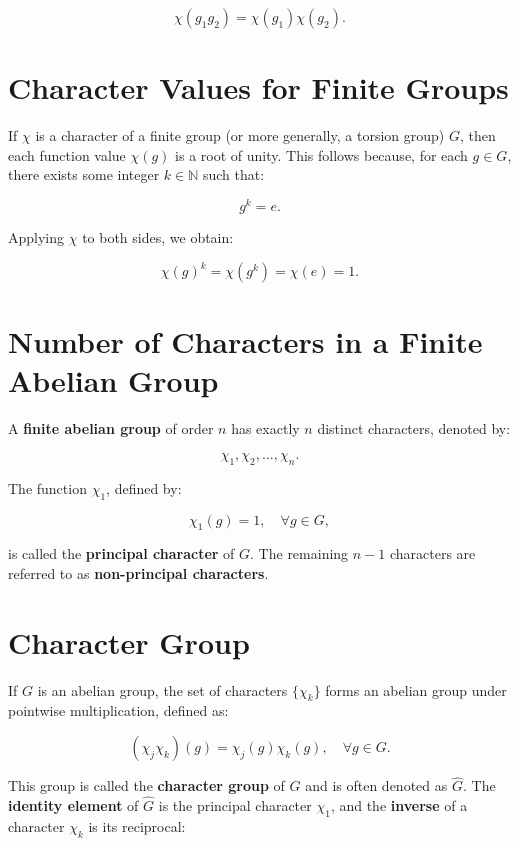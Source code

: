 \documentclass[11pt]{article}
\theoremstyle{definition}
\begin{document}
\[
\chi(g_1 g_2) = \chi(g_1) \chi(g_2).
\]

\section*{Character Values for Finite Groups}

If \( \chi \) is a character of a finite group (or more generally, a torsion group) \( G \), then each function value \( \chi(g) \) is a root of unity. This follows because, for each \( g \in G \), there exists some integer \( k \in \mathbb{N} \) such that:  

\[
g^k = e.
\]

Applying \( \chi \) to both sides, we obtain:  

\[
\chi(g)^k = \chi(g^k) = \chi(e) = 1.
\]

\section*{Number of Characters in a Finite Abelian Group}

A \textbf{finite abelian group} of order \( n \) has exactly \( n \) distinct characters, denoted by:  

\[
\chi_1, \chi_2, \dots, \chi_n.
\]

The function \( \chi_1 \), defined by:  

\[
\chi_1(g) = 1, \quad \forall g \in G,
\]

is called the \textbf{principal character} of \( G \). The remaining \( n-1 \) characters are referred to as \textbf{non-principal characters}.




\section*{Character Group}

If \( G \) is an abelian group, the set of characters \( \{\chi_k\} \) forms an abelian group under pointwise multiplication, defined as:  

\[
(\chi_j \chi_k)(g) = \chi_j(g) \chi_k(g), \quad \forall g \in G.
\]

This group is called the \textbf{character group} of \( G \) and is often denoted as $\hat{G}$.  
The \textbf{identity element} of \( \hat{G} \) is the principal character \( \chi_1 \), and the \textbf{inverse} of a character \( \chi_k \) is its reciprocal:  
\end{document}
